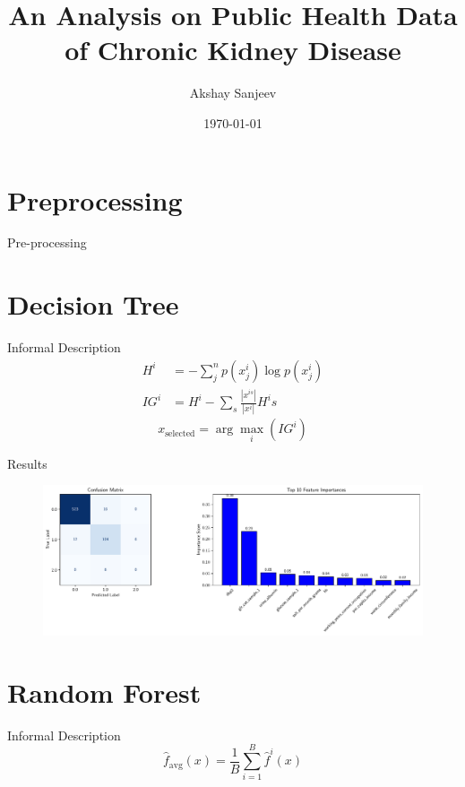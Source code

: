 \documentclass[mathserif]{beamer}
\title{An Analysis on Public Health Data\\ of Chronic Kidney Disease}
\author{Akshay Sanjeev }
\date{\today}
\begin{document}
\begin{frame}
    \maketitle
\end{frame}

\begin{frame}
    \tableofcontents
\end{frame}

\section{Preprocessing}
\begin{frame}{Pre-processing}

\end{frame}


\section{Decision Tree}
\begin{frame}{Informal Description}
    \begin{align}
        H^i &= -\sum_j^n p(x^i_j)\log p(x^i_j)\\
        IG^i &= H^i - \sum_s \frac{|x^{is}|}{|x^{i}|} H^is
    \end{align}
    \[x_{\text{selected}} = \arg \max_{i} (IG^i)\]
\end{frame}

\begin{frame}{Results}
    \begin{figure}
        \centering
        \includegraphics[scale=.35]{DT_summary.pdf}
    \end{figure}
\end{frame}


\section{Random Forest}
\begin{frame}{Informal Description}
    \[\hat{f}_{\text{avg}}(x) = \frac{1}{B}\sum_{i=1}^B \hat{f}^i(x)\]
\end{frame}
\end{document}
